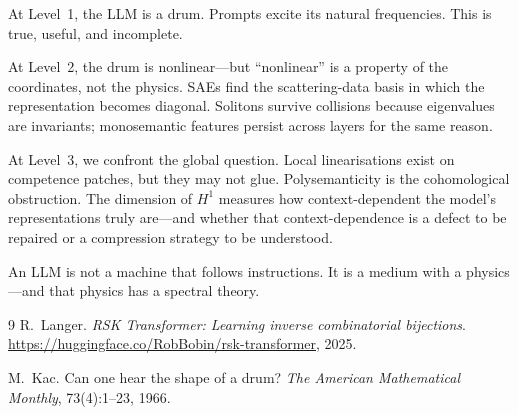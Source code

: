 \documentclass[11pt,a4paper]{article}
\begin{document}
\medskip
At Level~1, the LLM is a drum. Prompts excite its natural frequencies. This is
true, useful, and incomplete.

At Level~2, the drum is nonlinear---but ``nonlinear'' is a property of the
coordinates, not the physics. SAEs find the scattering-data basis in which the
representation becomes diagonal. Solitons survive collisions because eigenvalues
are invariants; monosemantic features persist across layers for the same reason.

At Level~3, we confront the global question. Local linearisations exist on
competence patches, but they may not glue. Polysemanticity is the cohomological
obstruction. The dimension of $H^1$ measures how context-dependent the model's
representations truly are---and whether that context-dependence is a defect to
be repaired or a compression strategy to be understood.

An LLM is not a machine that follows instructions. It is a medium with a
physics---and that physics has a spectral theory.

\begin{thebibliography}{9}
R.~Langer.
\emph{RSK Transformer: Learning inverse combinatorial bijections}.
\url{https://huggingface.co/RobBobin/rsk-transformer}, 2025.

M.~Kac.
Can one hear the shape of a drum?
\emph{The American Mathematical Monthly}, 73(4):1--23, 1966.

\end{thebibliography}
\end{document}
